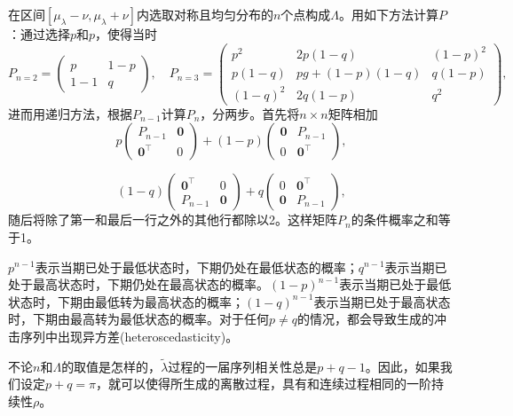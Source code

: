 \begin{subappendices}
在区间$[\mu_{\lambda} - \nu, \mu_{\lambda} + \nu]$内选取对称且均匀分布的$n$个点构成$\Lambda$。用如下方法计算$P$：通过选择$p$和$p$，使得当时
\begin{equation*}
P_{n=2} = \begin{pmatrix}
p & 1-p \\
1-1 & q
\end{pmatrix}, \quad P_{n=3} = \begin{pmatrix}
p^2 & 2p (1-q) & (1-p)^2 \\
p(1-q) & pg + (1-p)(1-q) & q(1-p)\\
(1-q)^2 & 2q(1-p) & q^2
\end{pmatrix},
\end{equation*}
进而用递归方法，根据$P_{n-1}$计算$P_n$，分两步。首先将$n \times n$矩阵相加
\begin{equation*}
  p \begin{pmatrix}
    P_{n-1} & \bm{0} \\
    \bm{0}^{\top} & 0
    \end{pmatrix}
    + (1-p) \begin{pmatrix}
    \bm{0} & P_{n-1} \\
    0 & \bm{0}^{\top}
    \end{pmatrix},
\end{equation*}

\begin{equation*}
    (1-q) \begin{pmatrix}
    \bm{0}^{\top} & 0\\
    P_{n-1} & \bm{0}
    \end{pmatrix}
    + q \begin{pmatrix}
    0 & \bm{0}^{\top} \\
    \bm{0} & P_{n-1}
    \end{pmatrix},
\end{equation*}
随后将除了第一和最后一行之外的其他行都除以2。这样矩阵$P_n$的条件概率之和等于1。

$p^{n-1}$表示当期已处于最低状态时，下期仍处在最低状态的概率；$q^{n-1}$表示当期已处于最高状态时，下期仍处在最高状态的概率。$ (1-p)^{n-1} $表示当期已处于最低状态时，下期由最低转为最高状态的概率；$ (1-q)^{n-1} $表示当期已处于最高状态时，下期由最高转为最低状态的概率。对于任何$p \neq q$的情况，都会导致生成的冲击序列中出现异方差(heteroscedasticity)。

不论$n$和$\Lambda$的取值是怎样的，$\tilde{\lambda}$过程的一届序列相关性总是$p+q-1$。因此，如果我们设定$p+q = \pi$，就可以使得所生成的离散过程，具有和连续过程相同的一阶持续性$\rho$。


\end{subappendices}
